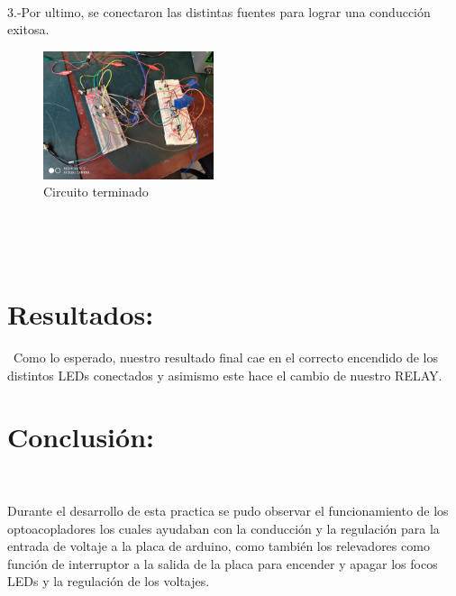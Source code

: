 \documentclass[12pt,letterpaper]{article}
\begin{document}
\

3.-Por ultimo, se conectaron las distintas fuentes para lograr una conducción exitosa.
\


\begin{figure}[h!]
\begin{center}
\includegraphics[width=5cm]{Circuito 2.jpeg} 
\caption{Circuito terminado}
\end{center}
\end{figure}

\

\

\section{Resultados:}
\
Como lo esperado, nuestro resultado final cae en el correcto encendido de los distintos LEDs conectados y asimismo este hace el cambio de nuestro RELAY.
\

\section{Conclusión:}
\

Durante el desarrollo de esta practica se pudo observar el funcionamiento de los optoacopladores los cuales ayudaban con la conducción y la regulación para la entrada de voltaje a la placa de arduino, como también los relevadores como función de interruptor a la salida de la placa para encender y apagar los focos LEDs y la regulación de los voltajes.
\end{document}
